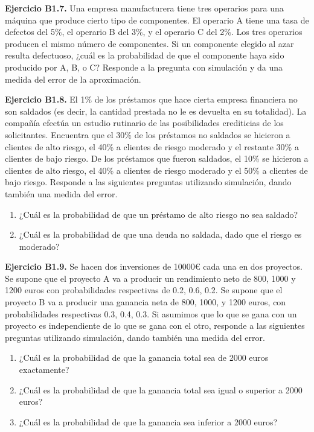 \documentclass[
]{book}
\providecommand{\tightlist}{%
  \setlength{\itemsep}{0pt}\setlength{\parskip}{0pt}}
\theoremstyle{definition}
\theoremstyle{definition}
\theoremstyle{definition}
\theoremstyle{definition}
\theoremstyle{remark}
\begin{document}
\textbf{Ejercicio B1.7.} Una empresa manufacturera tiene tres operarios para una máquina que produce cierto tipo de componentes. El operario A tiene una tasa de defectos del 5\%, el operario B del 3\%, y el operario C del 2\%. Los tres operarios producen el mismo número de componentes. Si un componente elegido al azar resulta defectuoso, ¿cuál es la probabilidad de que el componente haya sido producido por A, B, o C? Responde a la pregunta con simulación y da una medida del error de la aproximación.

\textbf{Ejercicio B1.8.} El 1\% de los préstamos que hace cierta empresa financiera no son saldados (es decir, la cantidad prestada no le es devuelta en su totalidad). La compañía efectúa un estudio rutinario de las posibilidades crediticias de los solicitantes. Encuentra que el 30\% de los préstamos no saldados se hicieron a clientes de alto riesgo, el 40\% a clientes de riesgo moderado y el restante 30\% a clientes de bajo riesgo. De los préstamos que fueron saldados, el 10\% se hicieron a clientes de alto riesgo, el 40\% a clientes de riesgo moderado y el 50\% a clientes de bajo riesgo. Responde a las siguientes preguntas utilizando simulación, dando también una medida del error.

\begin{enumerate}
\def\labelenumi{\arabic{enumi}.}
\tightlist
\item
  ¿Cuál es la probabilidad de que un préstamo de alto riesgo no sea saldado?
\item
  ¿Cuál es la probabilidad de que una deuda no saldada, dado que el riesgo es moderado?
\end{enumerate}

\textbf{Ejercicio B1.9.} Se hacen dos inversiones de 10000€ cada una en dos proyectos. Se supone que el proyecto A va a producir un rendimiento neto de 800, 1000 y 1200 euros con probabilidades respectivas de 0.2, 0.6, 0.2. Se supone que el proyecto B va a producir una ganancia neta de 800, 1000, y 1200 euros, con probabilidades respectivas 0.3, 0.4, 0.3. Si asumimos que lo que se gana con un proyecto es independiente de lo que se gana con el otro, responde a las siguientes preguntas utilizando simulación, dando también una medida del error.

\begin{enumerate}
\def\labelenumi{\arabic{enumi}.}
\tightlist
\item
  ¿Cuál es la probabilidad de que la ganancia total sea de 2000 euros exactamente?
\item
  ¿Cuál es la probabilidad de que la ganancia total sea igual o superior a 2000 euros?
\item
  ¿Cuál es la probabilidad de que la ganancia sea inferior a 2000 euros?
\end{enumerate}
\end{document}
